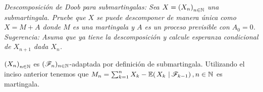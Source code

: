 \emph{
    Descomposici\'on de Doob para submartingalas: Sea $X=\left( X_n\right) _{n\in\mathbb{N}}$ una submartingala. 
    Pruebe que $X$ se puede descomponer de manera \'unica como $X=M+A$ donde $M$ es una martingala y $A$ 
    es un proceso previsible con $A_0=0$. Sugerencia: Asuma que ya tiene la descomposici\'on y calcule 
    esperanza condicional de $X_{n+1}$ dada $X_n$. 
}

\afterstatement\par\null

$\left( X_n\right) _{n\in\mathbb{N}}$ es $(\mathscr{F}_n)_{n \in \mathbb{N}}$-adaptada por definición de submartingala. Utilizando el inciso anterior tenemos
que $M_n = \sum_{k=1}^n X_k-\espc{X_k}{\F_{k-1}}, n \in \N$ es martingala.\par\null

%

